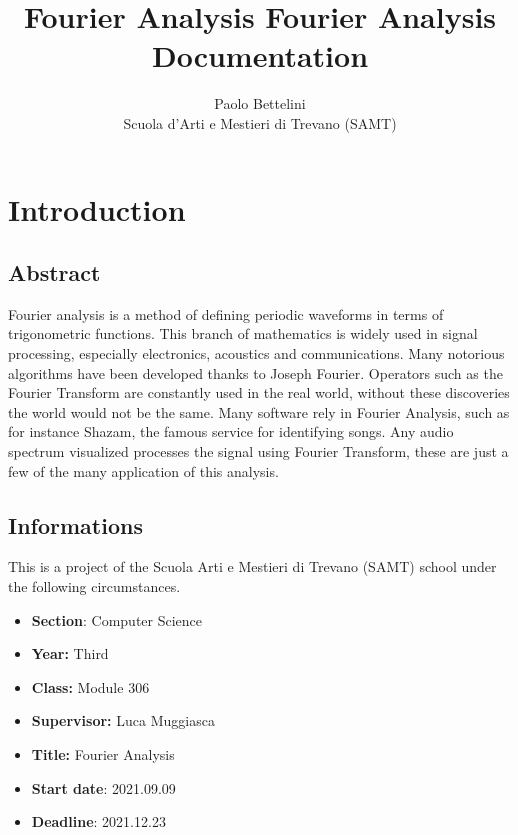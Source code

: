 \documentclass{article}
\title{Fourier Analysis}
\title{%
  Fourier Analysis \\
  \large Documentation}
\author{%
    Paolo Bettelini \\
    \large Scuola d'Arti e Mestieri di Trevano (SAMT)}
\date{}
\begin{document}
\maketitle

\tableofcontents

\pagebreak

\section{Introduction}

\subsection{Abstract}

Fourier analysis is a method of defining periodic waveforms in terms of trigonometric functions.
This branch of mathematics is widely used in signal processing, especially electronics, acoustics and communications.
Many notorious algorithms have been developed thanks to Joseph Fourier. Operators such as the Fourier
Transform are constantly used in the real world, without these discoveries the world would not be the same.
Many software rely in Fourier Analysis, such as for instance Shazam, the famous service for identifying songs.
Any audio spectrum visualized processes the signal using Fourier Transform, these are just a few of the many application of this analysis.

\pagebreak

\subsection{Informations}

This is a project of the Scuola Arti e Mestieri di Trevano (SAMT) school under the following circumstances.

\begin{itemize}
    \item \textbf{Section}: Computer Science
    \item \textbf{Year:} Third
    \item \textbf{Class:} Module 306
    \item \textbf{Supervisor:} Luca Muggiasca
    \item \textbf{Title:} Fourier Analysis
    \item \textbf{Start date}: 2021.09.09
    \item \textbf{Deadline}: 2021.12.23
\end{itemize}
\end{document}
